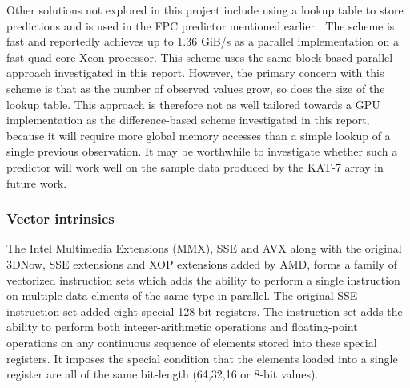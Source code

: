   Other solutions not explored in this project include using a lookup table to store predictions and is used in the FPC predictor mentioned earlier \cite{4589203}. The scheme is fast and reportedly achieves up to 
  1.36 GiB/s \cite{4976448} as a parallel implementation on a fast quad-core Xeon processor. This scheme uses the same block-based parallel approach investigated in this report. However, the primary concern with this 
  scheme is that as the number of observed values grow, so does the size of the lookup table. This approach is therefore not as well tailored towards a GPU implementation as the difference-based scheme investigated 
  in this report, because it will require more global memory accesses than a simple lookup of a single previous observation. It may be worthwhile to investigate whether such a predictor will work well on the sample data produced
  by the KAT-7 array in future work.
  \subsubsection{Vector intrinsics}
  The Intel Multimedia Extensions (MMX), SSE and AVX along with the original 3DNow, SSE extensions and XOP extensions added by AMD, forms a family of vectorized instruction sets which adds the ability to 
  perform a single instruction on multiple data elments of the same type in parallel. The original SSE instruction set added eight special 128-bit registers. The instruction set adds 
  the ability to perform both integer-arithmetic operations and floating-point operations on any continuous sequence of elements stored into these special registers. It imposes the special condition that the 
  elements loaded into a single register are all of the same bit-length (64,32,16 or 8-bit values).
  
